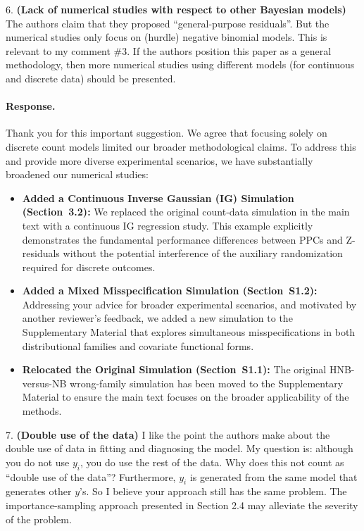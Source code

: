\documentclass[11pt]{article}
\newcommand*{\mybox}[2]{\colorbox{#1!30}{\parbox{.98\linewidth}{#2}}}
\begin{document}
\medskip

\mybox{gray}{6. \textbf{(Lack of numerical studies with respect to other Bayesian models)} The authors claim that they proposed ``general-purpose residuals''. But the numerical studies only focus on (hurdle) negative binomial models. This is relevant to my comment \#3. If the authors position this paper as a general methodology, then more numerical studies using different models (for continuous and discrete data) should be presented.}

\paragraph{Response.}

Thank you for this important suggestion. We agree that focusing solely on discrete count models limited our broader methodological claims. To address this and provide more diverse experimental scenarios, we have substantially broadened our numerical studies:
\begin{itemize}
\item \textbf{Added a Continuous Inverse Gaussian (IG) Simulation (Section~3.2):} We replaced the original count-data simulation in the main text with a continuous IG regression study. This example explicitly demonstrates the fundamental performance differences between PPCs and Z-residuals without the potential interference of the auxiliary randomization required for discrete outcomes.
\item \textbf{Added a Mixed Misspecification Simulation (Section~S1.2):} Addressing your advice for broader experimental scenarios, and motivated by another reviewer's feedback, we added a new simulation to the Supplementary Material that explores simultaneous misspecifications in both distributional families and covariate functional forms.
\item \textbf{Relocated the Original Simulation (Section~S1.1):} The original HNB-versus-NB wrong-family simulation has been moved to the Supplementary Material to ensure the main text focuses on the broader applicability of the methods.
\end{itemize}


\medskip

\mybox{gray}{7. \textbf{(Double use of the data)} I like the point the authors make about the double use of data in fitting and diagnosing the model. My question is: although you do not use $y_i$, you do use the rest of the data. Why does this not count as ``double use of the data''? Furthermore, $y_i$ is generated from the same model that generates other $y$'s. So I believe your approach still has the same problem. The importance-sampling approach presented in Section 2.4 may alleviate the severity of the problem.}
\end{document}
